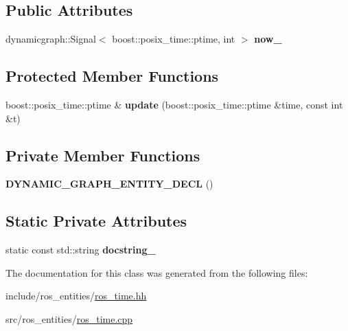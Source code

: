 \subsection*{Public Attributes}
\begin{DoxyCompactItemize}
\item 
\mbox{\label{classdynamic__graph_1_1RosTime_ac928e12f6defd2dbda5827010fa073b7}} 
dynamicgraph\+::\+Signal$<$ boost\+::posix\+\_\+time\+::ptime, int $>$ {\bfseries now\+\_\+}
\end{DoxyCompactItemize}
\subsection*{Protected Member Functions}
\begin{DoxyCompactItemize}
\item 
\mbox{\label{classdynamic__graph_1_1RosTime_a29444845a864140359ec5c77169f638d}} 
boost\+::posix\+\_\+time\+::ptime \& {\bfseries update} (boost\+::posix\+\_\+time\+::ptime \&time, const int \&t)
\end{DoxyCompactItemize}
\subsection*{Private Member Functions}
\begin{DoxyCompactItemize}
\item 
\mbox{\label{classdynamic__graph_1_1RosTime_ad4c1f7551d8f63129ecb6e6ecaf828e6}} 
{\bfseries D\+Y\+N\+A\+M\+I\+C\+\_\+\+G\+R\+A\+P\+H\+\_\+\+E\+N\+T\+I\+T\+Y\+\_\+\+D\+E\+CL} ()
\end{DoxyCompactItemize}
\subsection*{Static Private Attributes}
\begin{DoxyCompactItemize}
\item 
\mbox{\label{classdynamic__graph_1_1RosTime_a41b421e48816fc5533e2190124f6f48d}} 
static const std\+::string {\bfseries docstring\+\_\+}
\end{DoxyCompactItemize}


The documentation for this class was generated from the following files\+:\begin{DoxyCompactItemize}
\item 
include/ros\+\_\+entities/\hyperlink{ros__time_8hh}{ros\+\_\+time.\+hh}\item 
src/ros\+\_\+entities/\hyperlink{ros__time_8cpp}{ros\+\_\+time.\+cpp}\end{DoxyCompactItemize}
